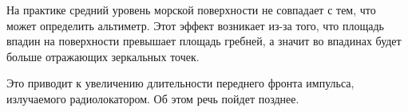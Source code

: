 На практике средний уровень морской поверхности не совпадает с тем, что может
определить альтиметр. Этот эффект возникает из-за того, что площадь впадин на
поверхности превышает площадь гребней, а значит во впадинах будет больше
отражающих зеркальных точек. 

Это приводит к увеличению длительности переднего фронта импульса, излучаемого
радиолокатором. Об этом речь пойдет позднее. 




 














